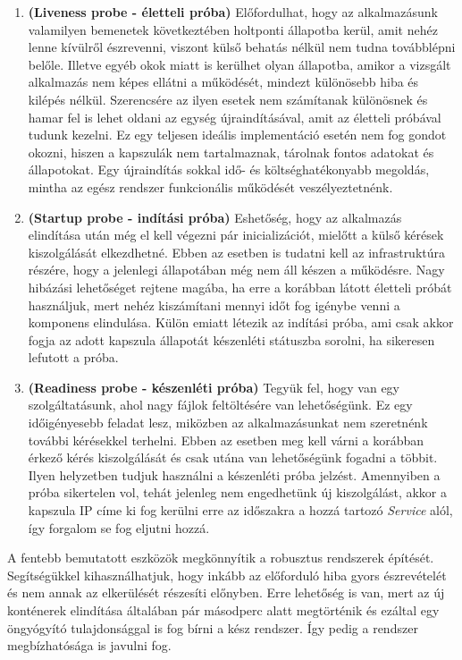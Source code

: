 \begin{enumerate}
    \item \textbf{(Liveness probe - életteli próba)} Előfordulhat, hogy az alkalmazásunk valamilyen bemenetek következtében holtponti állapotba kerül, amit nehéz lenne kívülről észrevenni, viszont külső behatás nélkül nem tudna továbblépni belőle. 
    Illetve egyéb okok miatt is kerülhet olyan állapotba, amikor a vizsgált alkalmazás nem képes ellátni a működését, mindezt különösebb hiba és kilépés nélkül.
    Szerencsére az ilyen esetek nem számítanak különösnek és hamar fel is lehet oldani az egység újraindításával, amit az életteli próbával tudunk kezelni.
    Ez egy teljesen ideális implementáció esetén nem fog gondot okozni, hiszen a kapszulák nem tartalmaznak, tárolnak fontos adatokat és állapotokat.
    Egy újraindítás sokkal idő- és költséghatékonyabb megoldás, mintha az egész rendszer funkcionális működését veszélyeztetnénk.

    \item \textbf{(Startup probe - indítási próba)} Eshetőség, hogy az alkalmazás elindítása után még el kell végezni pár inicializációt, mielőtt a külső kérések kiszolgálását elkezdhetné.
    Ebben az esetben is tudatni kell az infrastruktúra részére, hogy a jelenlegi állapotában még nem áll készen a működésre.
    Nagy hibázási lehetőséget rejtene magába, ha erre a korábban látott  életteli próbát használjuk, mert nehéz kiszámítani mennyi időt fog igénybe venni a komponens elindulása.
    Külön emiatt létezik az indítási próba, ami csak akkor fogja az adott kapszula állapotát készenléti státuszba sorolni, ha sikeresen lefutott a próba.

    \item \textbf{(Readiness probe - készenléti próba)} Tegyük fel, hogy van egy szolgáltatásunk, ahol nagy fájlok feltöltésére van lehetőségünk.
    Ez egy időigényesebb feladat lesz, miközben az alkalmazásunkat nem szeretnénk további kérésekkel terhelni.
    Ebben az esetben meg kell várni a korábban érkező kérés kiszolgálását és csak utána van lehetőségünk fogadni a többit.
    Ilyen helyzetben tudjuk használni a készenléti próba jelzést. 
    Amennyiben a próba sikertelen vol, tehát jelenleg nem engedhetünk új kiszolgálást, akkor a kapszula IP címe ki fog kerülni erre az időszakra a hozzá tartozó \textit{Service} alól, így forgalom se fog eljutni hozzá. 
    
\end{enumerate}

A fentebb bemutatott eszközök megkönnyítik a robusztus rendszerek építését.
Segítségükkel kihasználhatjuk, hogy inkább az előforduló hiba gyors észrevételét és nem annak az elkerülését részesíti előnyben.
Erre lehetőség is van, mert az új konténerek elindítása általában pár másodperc alatt megtörténik és ezáltal egy öngyógyító tulajdonsággal is fog bírni a kész rendszer.
Így pedig a rendszer megbízhatósága is javulni fog. 

